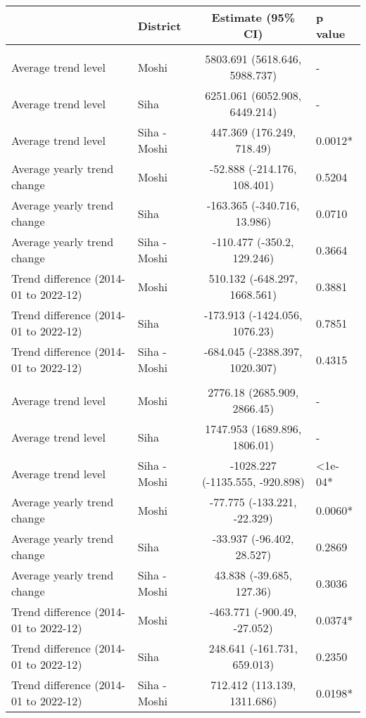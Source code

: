 \begin{longtable}{l|lcl}
\toprule
\multicolumn{1}{l}{} & District & Estimate (95\% CI) & p value \\ 
\midrule\addlinespace[2.5pt]
\multicolumn{4}{l}{Infectious/Communicable Diseases} \\ 
\midrule\addlinespace[2.5pt]
Average trend level & Moshi & 5803.691 (5618.646, 5988.737) & - \\ 
Average trend level & Siha & 6251.061 (6052.908, 6449.214) & - \\ 
Average trend level & Siha - Moshi & 447.369 (176.249, 718.49) & 0.0012* \\ 
Average yearly trend change & Moshi & -52.888 (-214.176, 108.401) & 0.5204 \\ 
Average yearly trend change & Siha & -163.365 (-340.716, 13.986) & 0.0710 \\ 
Average yearly trend change & Siha - Moshi & -110.477 (-350.2, 129.246) & 0.3664 \\ 
Trend difference (2014-01 to 2022-12) & Moshi & 510.132 (-648.297, 1668.561) & 0.3881 \\ 
Trend difference (2014-01 to 2022-12) & Siha & -173.913 (-1424.056, 1076.23) & 0.7851 \\ 
Trend difference (2014-01 to 2022-12) & Siha - Moshi & -684.045 (-2388.397, 1020.307) & 0.4315 \\ 
\midrule\addlinespace[2.5pt]
\multicolumn{4}{l}{Non-Communicable Diseases} \\ 
\midrule\addlinespace[2.5pt]
Average trend level & Moshi & 2776.18 (2685.909, 2866.45) & - \\ 
Average trend level & Siha & 1747.953 (1689.896, 1806.01) & - \\ 
Average trend level & Siha - Moshi & -1028.227 (-1135.555, -920.898) & <1e-04* \\ 
Average yearly trend change & Moshi & -77.775 (-133.221, -22.329) & 0.0060* \\ 
Average yearly trend change & Siha & -33.937 (-96.402, 28.527) & 0.2869 \\ 
Average yearly trend change & Siha - Moshi & 43.838 (-39.685, 127.36) & 0.3036 \\ 
Trend difference (2014-01 to 2022-12) & Moshi & -463.771 (-900.49, -27.052) & 0.0374* \\ 
Trend difference (2014-01 to 2022-12) & Siha & 248.641 (-161.731, 659.013) & 0.2350 \\ 
Trend difference (2014-01 to 2022-12) & Siha - Moshi & 712.412 (113.139, 1311.686) & 0.0198* \\ 
\bottomrule
\end{longtable}

